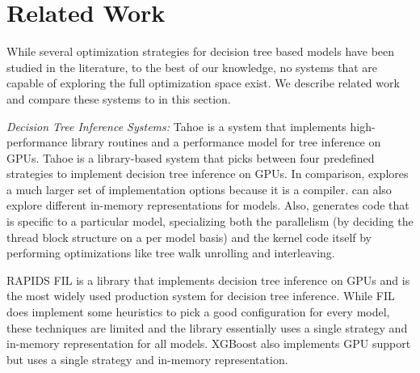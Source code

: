 \section{Related Work}
\label{Sec:Related}
While several optimization strategies for decision tree based models have been 
studied in the literature, to the best of our knowledge, no systems that are 
capable of exploring the full optimization space exist. We describe related work 
and compare these systems to \Treebeard{} in this section.

\emph{Decision Tree Inference Systems:} 
Tahoe\cite{Tahoe} is a system that implements high-performance library routines and a 
performance model for tree inference on GPUs. Tahoe is a library-based system that picks 
between four predefined strategies to implement decision tree inference on GPUs.
In comparison, \Treebeard{} explores a much larger set of implementation options 
because it is a compiler. \Treebeard{} can also explore different in-memory 
representations for models. Also, \Treebeard{} generates code that is specific to 
a particular model, specializing both the parallelism (by deciding the thread block 
structure on a per model basis) and the kernel code itself by 
performing optimizations like tree walk unrolling and interleaving.

RAPIDS FIL\cite{FIL} is a library that implements decision tree inference on GPUs
and is the most widely used production system for decision tree inference. While 
FIL does implement some heuristics to pick a good configuration for every model, 
these techniques are limited and the library essentially uses a single strategy 
and in-memory representation for all models. XGBoost \cite{XGBoost} also implements GPU 
support\cite{XGBGPU} but uses a single strategy and in-memory representation. 

